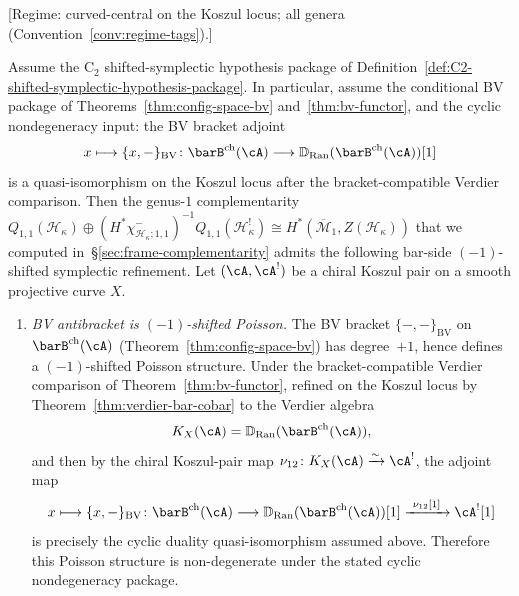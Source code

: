 \begin{theorem}
\label{thm:shifted-symplectic-complementarity}
\textup{[Regime: curved-central on the Koszul locus; all genera
\textup{(}Convention~\textup{\ref{conv:regime-tags})}.]}

Assume the $\mathrm{C}_2$ shifted-symplectic hypothesis package of
Definition~\ref{def:C2-shifted-symplectic-hypothesis-package}. In
particular, assume the conditional BV package of
Theorems~\ref{thm:config-space-bv} and~\ref{thm:bv-functor}, and the
cyclic nondegeneracy input: the BV bracket adjoint
\[
x \longmapsto \{x,-\}_{\mathrm{BV}} \colon
\barB^{\mathrm{ch}}(\cA)
\longrightarrow
\mathbb{D}_{\operatorname{Ran}}(\barB^{\mathrm{ch}}(\cA))[1]
\]
is a quasi-isomorphism on the Koszul locus after the
bracket-compatible Verdier comparison. Then the
genus-$1$ complementarity
$Q_{1,1}(\mathcal{H}_\kappa)\oplus
(H^*\chi^-_{\mathcal H_\kappa;1,1})^{-1}
Q_{1,1}(\mathcal{H}_\kappa^!)
\cong H^*(\overline{\mathcal{M}}_1, Z(\mathcal{H}_\kappa))$ that we
computed in~\S\ref{sec:frame-complementarity} admits the following
bar-side $(-1)$-shifted symplectic refinement.
Let $(\cA, \cA^!)$ be a chiral Koszul pair on a smooth projective
curve $X$.
\begin{enumerate}[label=\textup{(\roman*)}]
\item \emph{BV antibracket is $(-1)$-shifted Poisson.}
 The BV bracket $\{-,-\}_{\mathrm{BV}}$ on
 $\barB^{\mathrm{ch}}(\cA)$
 \textup{(}Theorem~\textup{\ref{thm:config-space-bv}}\textup{)}
 has degree~$+1$, hence defines a $(-1)$-shifted Poisson structure.
 Under the bracket-compatible Verdier comparison of
 Theorem~\textup{\ref{thm:bv-functor}}, refined on the Koszul locus by
 Theorem~\textup{\ref{thm:verdier-bar-cobar}} to the Verdier algebra
 \[
 K_X(\cA)=\mathbb{D}_{\operatorname{Ran}}
 (\barB^{\mathrm{ch}}(\cA)),
 \]
 and then by the chiral Koszul-pair map
 $\nu_{12}\colon K_X(\cA)\xrightarrow{\sim}\cA^!$, the adjoint map
 \[
 x \longmapsto \{x,-\}_{\mathrm{BV}} \colon
 \barB^{\mathrm{ch}}(\cA)
 \longrightarrow
 \mathbb{D}_{\operatorname{Ran}}(\barB^{\mathrm{ch}}(\cA))[1]
 \xrightarrow{\ \nu_{12}[1]\ }
 \cA^![1]
 \]
 is precisely the cyclic duality quasi-isomorphism assumed above.
 Therefore this Poisson structure is non-degenerate under the stated
 cyclic nondegeneracy package.


\end{enumerate}
\end{theorem}
